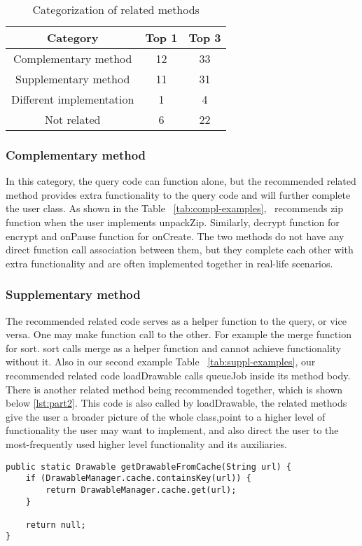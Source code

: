 \begin{table}
	\begin{center}
		\begin{tabular}{ c|c|c } 
			Category & Top 1 & Top 3 \\\hline
			Complementary method &  12 & 33\\\hline 
			Supplementary method &  11 & 31 \\ \hline
			Different implementation &  1 & 4 \\ \hline
			Not related & 6 & 22
		\end{tabular}		
	\end{center}
	\caption{Categorization of related methods}
	\label{tab:categorization}
\end{table}
	
	

\subsubsection{Complementary method} In this category, the query code can function alone, but the recommended related method provides extra functionality to the query code and will further complete the user class. As shown in the Table ~\ref{tab:compl-examples}, \tool\ recommends {\ttt zip} function when the user implements {\ttt unpackZip}. Similarly, {\ttt decrypt} function for {\ttt encrypt} and {\ttt onPause} function for {\ttt onCreate}. The two methods do not have any direct function call association between them, but they complete each other with extra functionality and are often implemented together in real-life scenarios. 

\subsubsection{Supplementary method} The recommended related code serves as a helper function to the query, or vice versa. One may make function call to the other. For example the {\ttt merge} function for {\ttt sort}. {\ttt sort} calls {\ttt merge} as a helper function and cannot achieve functionality without it. Also in our second example Table ~\ref{tab:suppl-examples}, our recommended related code {\ttt loadDrawable} calls {\ttt queueJob} inside its method body. There is another related method being recommended together, which is shown below \ref{lst:part2}. This code is also called by {\ttt loadDrawable}, the related methods give the user a broader picture of the whole class,point to a higher level of functionality the user may want to implement, and also direct the user to the most-frequently used higher level functionality and its auxiliaries.
\begin{lstlisting}[caption={Recommended code \#2}, label={lst:part2}]
public static Drawable getDrawableFromCache(String url) {
	if (DrawableManager.cache.containsKey(url)) {
		return DrawableManager.cache.get(url);
	}
	
	return null;
}	
\end{lstlisting}

